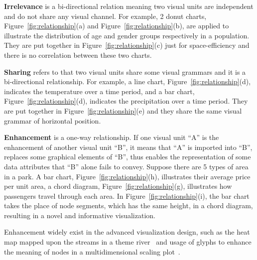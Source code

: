 \textbf{Irrelevance} is a bi-directional relation meaning two visual units are independent and do not share any visual channel.
For example, 2 donut charts, Figure~\ref{fig:relationship}(a) and Figure~\ref{fig:relationship}(b), are applied to illustrate the distribution of age and gender groups respectively in a population. They are put together in Figure~\ref{fig:relationship}(c) just for space-efficiency and there is no correlation between these two charts. 

\noindent
\textbf{Sharing} refers to that two visual units share some visual grammars and it is a bi-directional relationship. 
For example, a line chart, Figure~\ref{fig:relationship}(d), indicates the temperature over a time period, and a bar chart, Figure~\ref{fig:relationship}(d), indicates the precipitation over a time period. They are put together in Figure~\ref{fig:relationship}(e) and they share the same visual grammar of horizontal position.  


\noindent
\textbf{Enhancement} is a one-way relationship. If one visual unit ``A'' is the enhancement of another visual unit ``B'', it means that ``A'' is imported into ``B'', replaces some graphical elements of ``B'', thus enables the representation of some data attributes that ``B'' alone fails to convey. Suppose there are 5 types of area in a park. A bar chart, Figure~\ref{fig:relationship}(h), illustrates their average price per unit area, a chord diagram, Figure~\ref{fig:relationship}(g), illustrates how passengers travel through each area. In Figure~\ref{fig:relationship}(i), the bar chart takes the place of node segments, which has the same height, in a chord diagram, resulting in a novel and informative visualization.
 
Enhancement widely exist in the advanced visualization design, such as the heat map mapped upon the streams in a theme river~\cite{wu_opinionflow:_2014}  and usage of glyphs to enhance the meaning of nodes in a multidimensional scaling plot~\cite{chen_peakvizor:_2016}. 

